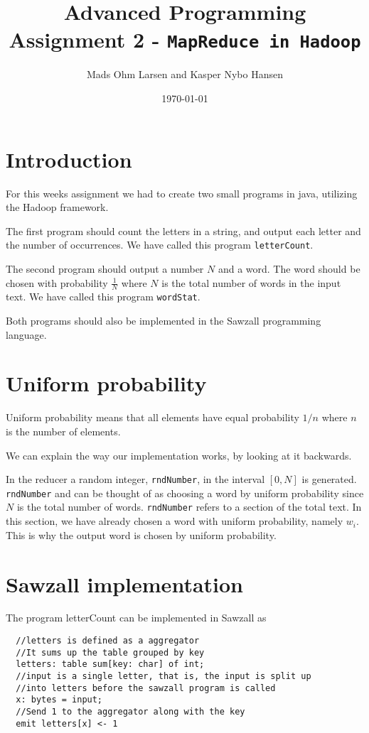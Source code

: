 \documentclass[10pt, a4paper]{article}
\title{Advanced Programming \\\small{Assignment 2} - \texttt{MapReduce in Hadoop}}
\author{Mads Ohm Larsen and Kasper Nybo Hansen}
\date{\today}
\begin{document}
	
\maketitle

\section{Introduction} %
\label{sec:introduction}
For this weeks assignment we had to create two small programs in java, utilizing the Hadoop framework. 

The first program should count the letters in a string, and output each letter and the number of occurrences. We have called this program \texttt{letterCount}.


The second program should output a number $N$ and a word. The word should be chosen with probability $\frac{1}{N}$ where $N$ is the total number of words in the input text. We have called this program \texttt{wordStat}.

Both programs should also be implemented in the Sawzall programming language.

\section{Uniform probability} %
\label{sec:uniform_probability}
Uniform probability means that all elements have equal probability $1/n$ where $n$ is the number of elements.

We can explain the way our implementation works, by looking at it backwards. 

In the reducer a random integer, \texttt{rndNumber}, in the interval $[0,N]$ is generated. \texttt{rndNumber} and can be thought of as choosing a word by uniform probability since $N$ is the total number of words. \texttt{rndNumber} refers to a section of the total text. In this section, we have already chosen a word with uniform probability, namely $w_i$. This is why the output word is chosen by uniform probability.



\section{Sawzall implementation} %
\label{sec:sawzall_implementation}
The program letterCount can be implemented in Sawzall as 


\begin{verbatim}
  //letters is defined as a aggregator
  //It sums up the table grouped by key
  letters: table sum[key: char] of int;
  //input is a single letter, that is, the input is split up 
  //into letters before the sawzall program is called
  x: bytes = input;
  //Send 1 to the aggregator along with the key
  emit letters[x] <- 1  
\end{verbatim}
\end{document}
